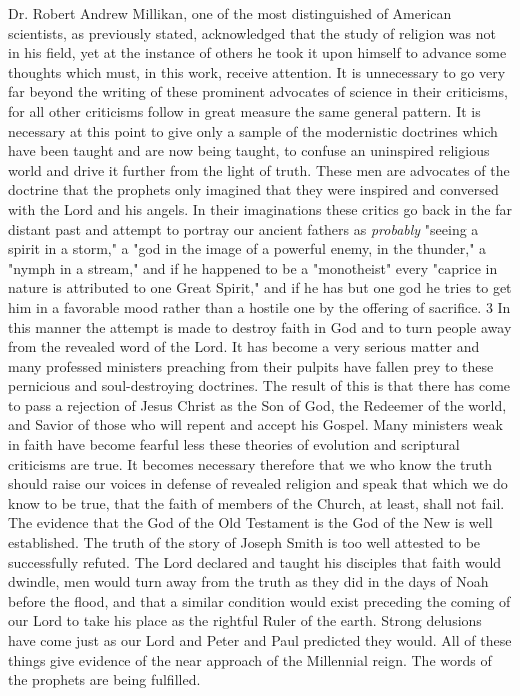 Dr. Robert Andrew Millikan, one of the most distinguished of American scientists, as
previously stated, acknowledged that the study of religion was not in his field, yet at the
instance of others he took it upon himself to advance some thoughts which must, in this
work, receive attention. It is unnecessary to go very far beyond the writing of these
prominent advocates of science in their criticisms, for all other criticisms follow in great
measure the same general pattern. It is necessary at this point to give only a sample of the
modernistic doctrines which have been taught and are now being taught, to confuse an
uninspired religious world and drive it further from the light of truth. These men are
advocates of the doctrine that the prophets only imagined that they were inspired and
conversed with the Lord and his angels. In their imaginations these critics go back in the far
distant past and attempt to portray our ancient fathers as \textit{probably} "seeing a spirit in a storm,"
a "god in the image of a powerful enemy, in the thunder," a "nymph in a stream," and if he
happened to be a "monotheist" every "caprice in nature is attributed to one Great Spirit," and
if he has but one god he tries to get him in a favorable mood rather than a hostile one by the
offering of sacrifice. 3 In this manner the attempt is made to destroy faith in God and to turn
people away from the revealed word of the Lord. It has become a very serious matter and
many professed ministers preaching from their pulpits have fallen prey to these pernicious
and soul-destroying doctrines. The result of this is that there has come to pass a rejection of
Jesus Christ as the Son of God, the Redeemer of the world, and Savior of those who will
repent and accept his Gospel. Many ministers weak in faith have become fearful less these
theories of evolution and scriptural criticisms are true. It becomes necessary therefore that we
who know the truth should raise our voices in defense of revealed religion and speak that
which we do know to be true, that the faith of members of the Church, at least, shall not fail.
The evidence that the God of the Old Testament is the God of the New is well established.
The truth of the story of Joseph Smith is too well attested to be successfully refuted. The
Lord declared and taught his disciples that faith would dwindle, men would turn away from
the truth as they did in the days of Noah before the flood, and that a similar condition would
exist preceding the coming of our Lord to take his place as the rightful Ruler of the earth.
Strong delusions have come just as our Lord and Peter and Paul predicted they would. All of
these things give evidence of the near approach of the Millennial reign. The words of the
prophets are being fulfilled.

